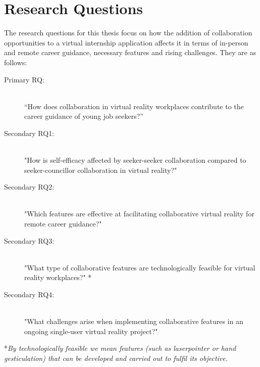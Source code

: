\section{Research Questions}
The research questions for this thesis focus on how the addition of collaboration opportunities to a virtual internship application affects it in terms of in-person and remote career guidance, necessary features and rising challenges. They are as follows:
\label{RQ}
\begin{description}
    \item [Primary RQ:]\hfill \\
    “How does collaboration in virtual reality workplaces contribute to the career guidance of young job seekers?” 
    \item [Secondary RQ1:]\hfill \\
    "How is self-efficacy affected by seeker-seeker collaboration compared to seeker-councillor collaboration in virtual reality?"
    \item [Secondary RQ2:]\hfill \\
    "Which features are effective at facilitating collaborative virtual reality for remote career guidance?"
    \item [Secondary RQ3:]\hfill \\
    "What type of collaborative features are technologically feasible for virtual reality workplaces?" *
    \item  [Secondary RQ4:]\hfill \\
    "What challenges arise when implementing collaborative features in an ongoing single-user virtual reality project?"
    
\end{description}

\vspace{2cm}
*\textit{By technologically feasible we mean features (such as laserpointer or hand gesticulation) that can be developed and carried out to fulfil its objective. }


\cleardoublepage
